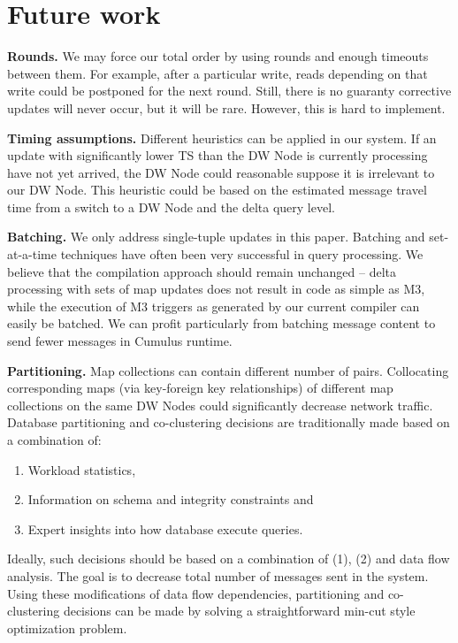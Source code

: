 \documentclass{sig-semester}
\def\M3{M3\xspace}
\begin{document}
\section{Future work}
\label{sec:Future}
\vspace{2mm}

\textbf{Rounds.} We may force our total order by using rounds and enough timeouts between them. For example, after a particular write, reads depending on that write could be postponed for the next round. Still, there is no guaranty corrective updates will never occur, but it will be rare. However, this is hard to implement.

\textbf{Timing assumptions.} Different heuristics can be applied in our system. If an update with significantly lower TS than the DW Node is currently processing have not yet arrived, the DW Node could reasonable suppose it is irrelevant to our DW Node. This heuristic could be based on the estimated message travel time from a switch to a DW Node and the delta query level.

\textbf{Batching.} We only address single-tuple updates in this paper.
Batching and set-at-a-time techniques have often been
very successful in query processing.
We believe that the compilation approach
should remain unchanged -- delta processing with sets of map updates does not
result in code as simple as \M3, while the
execution of \M3 triggers as generated by our current compiler
can easily be batched. We can profit
particularly from batching message content to send fewer messages in
Cumulus runtime.

\textbf{Partitioning.}
Map collections can contain different number of pairs. Collocating corresponding maps (via key-foreign key relationships) of different map collections on the same DW Nodes could significantly decrease network traffic. Database partitioning and co-clustering decisions are traditionally made based on a combination of: 
\begin{enumerate}[(1)]
 \item Workload statistics, 
 \item Information on schema and integrity constraints and
 \item Expert insights into how database execute queries.
\end{enumerate}

Ideally, such decisions should be based on a combination of (1), (2) and data flow analysis. The goal is to decrease total number of messages sent in the system. Using these modifications of data flow dependencies, partitioning and co-clustering decisions can be made by solving a straightforward min-cut style optimization problem. 
\end{document}
